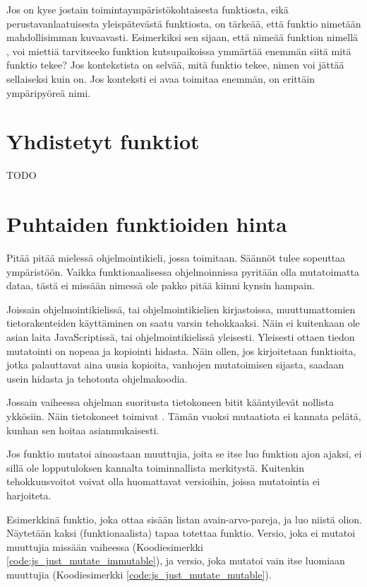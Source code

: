 Jos on kyse jostain toimintaympäristökohtaisesta funktiosta, eikä perustavanlaatuisesta yleispätevästä funktiosta, on tärkeää, että funktio nimetään mahdollisimman kuvaavasti. Esimerkiksi sen sijaan, että nimeää funktion nimellä \textcite{processUsers}, voi miettiä tarvitseeko funktion kutsupaikoissa ymmärtää enemmän siitä mitä funktio tekee? Jos kontekstista on selvää, mitä funktio tekee, nimen voi jättää sellaiseksi kuin on. Jos konteksti ei avaa toimitaa enemmän, \textcite{processUsers} on erittäin ympäripyöreä nimi.

\section{Yhdistetyt funktiot}

TODO

\section{Puhtaiden funktioiden hinta}

Pitää pitää mielessä ohjelmointikieli, jossa toimitaan. Säännöt tulee sopeuttaa ympäristöön. Vaikka funktionaalisessa ohjelmoinnissa pyritään olla mutatoimatta dataa, tästä ei missään nimessä ole pakko pitää kiinni kynsin hampain.

Joissain ohjelmointikielissä, tai ohjelmointikielien kirjastoissa, muuttumattomien tietorakenteiden käyttäminen on saatu varsin tehokkaaksi. Näin ei kuitenkaan ole asian laita JavaScriptissä, tai ohjelmointikielissä yleisesti. Yleisesti ottaen tiedon mutatointi on nopeaa ja kopiointi hidasta. Näin ollen, jos kirjoitetaan funktioita, jotka palauttavat aina uusia kopioita, vanhojen mutatoimisen sijasta, saadaan usein hidasta ja tehotonta ohjelmakoodia.

Jossain vaiheessa ohjelman suoritusta tietokoneen bitit kääntyilevät nollista ykkösiin. Näin tietokoneet toimivat \cite{is_reduce_bad}. Tämän vuoksi mutaatiota ei kannata pelätä, kunhan sen hoitaa asianmukaisesti.

Jos funktio mutatoi ainoastaan muuttujia, joita se itse luo funktion ajon ajaksi, ei sillä ole lopputuloksen kannalta toiminnallista merkitystä. Kuitenkin tehokkuusvoitot voivat olla huomattavat versioihin, joissa mutatointia ei harjoiteta.

Esimerkkinä funktio, joka ottaa sisään listan avain-arvo-pareja, ja luo niistä olion. Näytetään kaksi (funktionaalista) tapaa totettaa funktio.
Versio, joka ei mutatoi muuttujia missään vaiheessa (Koodiesimerkki \ref{code:js_just_mutate_immutable}), ja versio, joka mutatoi vain itse luomiaan muuttujia (Koodiesimerkki \ref{code:js_just_mutate_mutable}).


